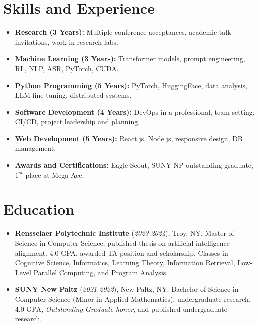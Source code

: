 \documentclass[11pt]{article}
\begin{document}
\section*{Skills and Experience}
\begin{itemize}
    \itemsep0em
    
    \item \textbf{Research (3 Years):} Multiple conference acceptances, academic talk invitations, work in research labs.
    \item \textbf{Machine Learning (3 Years):} Transformer models, prompt engineering, RL, NLP, ASR, PyTorch, CUDA.
    \item \textbf{Python Programming (5 Years):} PyTorch, HuggingFace, data analysis, LLM fine-tuning, distributed systems.
    \item \textbf{Software Development (4 Years):} DevOps in a professional, team setting, CI/CD, project leadership and planning.
    \item \textbf{Web Development (5 Years):} React.js, Node.js, responsive design, DB management.
    \item \textbf{Awards and Certifications:} Eagle Scout, SUNY NP outstanding graduate, $1^{st}$ place at Mega-Ace.

\end{itemize}

\section*{Education}
\begin{itemize}
    \itemsep0em

    \item \textbf{Rensselaer Polytechnic Institute} (\textit{2023-2024}), Troy, NY. Master of Science in Computer Science, published thesis on artificial intelligence alignment.  4.0 GPA, awarded TA position and scholarship.  Classes in Cognitive Science, Informatics, Learning Theory, Information Retrieval, Low-Level Parallel Computing, and Program Analysis.
    
    \item \textbf{SUNY New Paltz} (\textit{2021-2022}), New Paltz, NY. Bachelor of Science in Computer Science (Minor in Applied Mathematics), undergraduate research. 4.0 GPA, \textit{Outstanding Graduate honor}, and published undergraduate research.

\end{itemize}
\end{document}
